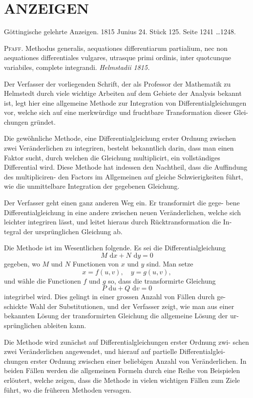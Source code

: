 \documentclass[12pt,a4paper]{article}
\newcommand{\dd}{\,\mathrm{d}}
\begin{document}
\section*{ANZEIGEN}

Göttingische gelehrte Anzeigen. 1815 Junius 24. Stück 125. Seite 1241 \ldots 1248.

\textsc{Pfaff.} Methodus generalis, aequationes differentiarum partialium, nec non
aequationes differentiales vulgares, utrasque primi ordinis, inter quotcunque variabiles,
complete integrandi. \textit{Helmstadii 1815.}

Der Verfasser der vorliegenden Schrift, der als Professor der Mathematik
zu Helmstedt durch viele wichtige Arbeiten auf dem Gebiete der Analysis bekannt
ist, legt hier eine allgemeine Methode zur Integration von Differentialgleichungen
vor, welche sich auf eine merkwürdige und fruchtbare Transformation dieser Glei-
chungen gründet.

Die gewöhnliche Methode, eine Differentialgleichung erster Ordnung zwischen
zwei Veränderlichen zu integriren, besteht bekanntlich darin, dass man einen Faktor
sucht, durch welchen die Gleichung multiplicirt, ein vollständiges Differential wird.
Diese Methode hat indessen den Nachtheil, dass die Auffindung des multipliciren-
den Factors im Allgemeinen auf gleiche Schwierigkeiten führt, wie die unmittelbare
Integration der gegebenen Gleichung.

Der Verfasser geht einen ganz anderen Weg ein. Er transformirt die gege-
bene Differentialgleichung in eine andere zwischen neuen Veränderlichen, welche
sich leichter integriren lässt, und leitet hieraus durch Rücktransformation die In-
tegral der ursprünglichen Gleichung ab.

Die Methode ist im Wesentlichen folgende. Es sei die Differentialgleichung
\[
M \, \dd x + N \, \dd y = 0
\]
gegeben, wo $M$ und $N$ Functionen von $x$ und $y$ sind. Man setze
\[
x = f(u, v), \quad y = g(u, v),
\]
und wähle die Functionen $f$ und $g$ so, dass die transformirte Gleichung
\[
P \, \dd u + Q \, \dd v = 0
\]
integrirbel wird. Dies gelingt in einer grossen Anzahl von Fällen durch ge-
schickte Wahl der Substitutionen, und der Verfasser zeigt, wie man aus einer
bekannten Lösung der transformirten Gleichung die allgemeine Lösung der ur-
sprünglichen ableiten kann.

Die Methode wird zunächst auf Differentialgleichungen erster Ordnung zwi-
schen zwei Veränderlichen angewendet, und hierauf auf partielle Differentialglei-
chungen erster Ordnung zwischen einer beliebigen Anzahl von Veränderlichen.
In beiden Fällen werden die allgemeinen Formeln durch eine Reihe von Beispielen
erlöutert, welche zeigen, dass die Methode in vielen wichtigen Fällen zum Ziele
führt, wo die früheren Methoden versagen.
\end{document}
